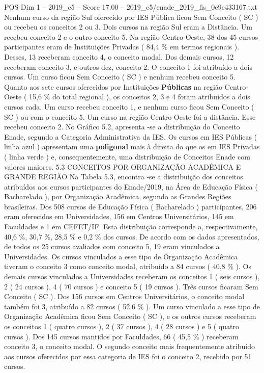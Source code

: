 \begin{textsample}{POS Dim 1 – 2019\_c5 – Score 17.00 – 2019\_c5/enade\_2019\_fis\_0e9c433167.txt}
Nenhum curso da região Sul oferecido por IES Pública ficou Sem Conceito ( SC ) ou recebeu os conceitos 2 ou 3.
Dois cursos na região Sul eram a Distância.
Um recebeu conceito 2 e o outro conceito 5.
Na região Centro-Oeste, 38 dos 45 cursos participantes eram de Instituições Privadas ( 84,4 \% em termos regionais ).
Desses, 13 receberam conceito 4, o conceito modal.
Dos demais cursos, 12 receberam conceito 3, e outros dez, conceito 2.
O conceito 1 foi atribuído a dois cursos.
Um curso ficou Sem Conceito ( SC ) e nenhum recebeu conceito 5.
Quanto aos sete cursos oferecidos por Instituições \textbf{Públicas} na região Centro-Oeste ( 15,6 \% do total regional ), os conceitos 2, 3 e 4 foram atribuídos a dois cursos cada.
Um curso recebeu conceito 1, e nenhum curso ficou Sem Conceito ( SC ) ou com o conceito 5.
Um curso na região Centro-Oeste foi a distância.
Esse recebeu conceito 2.
No Gráfico 5.2, apresenta -se a distribuição do Conceito Enade, segundo a Categoria Administrativa da IES.
Os cursos em IES Públicas ( linha azul ) apresentam uma \textbf{poligonal} mais à direita do que os em IES Privadas ( linha verde ) e, consequentemente, uma distribuição de Conceitos Enade com valores maiores. 5.3 CONCEITOS POR ORGANIZAÇÃO ACADÊMICA E GRANDE REGIÃO Na Tabela 5.3, encontra -se a distribuição dos conceitos atribuídos aos cursos participantes do Enade/2019, na Área de Educação Física ( Bacharelado ), por Organização Acadêmica, segundo as Grandes Regiões brasileiras.
Dos 508 cursos de Educação Física ( Bacharelado ) participantes, 206 eram oferecidos em Universidades, 156 em Centros Universitários, 145 em Faculdades e 1 em CEFET/IF.
Esta distribuição corresponde a, respectivamente, 40,6 \%, 30,7 \%, 28,5 \% e 0,2 \% dos cursos.
De acordo com os dados apresentados, de todos os 25 cursos avaliados com conceito 5, 19 eram vinculados a Universidades.
Os cursos vinculados a esse tipo de Organização Acadêmica tiveram o conceito 3 como conceito modal, atribuído a 84 cursos ( 40,8 \% ).
Os demais cursos vinculados a Universidades receberam os conceitos 1 ( seis cursos ), 2 ( 24 cursos ), 4 ( 70 cursos ) e conceito 5 ( 19 cursos ).
Três cursos ficaram Sem Conceito ( SC ).
Dos 156 cursos em Centros Universitários, o conceito modal também foi 3, atribuído a 82 cursos ( 52,6 \% ).
Um curso vinculado a esse tipo de Organização Acadêmica ficou Sem Conceito ( SC ), e os outros cursos receberam os conceitos 1 ( quatro cursos ), 2 ( 37 cursos ), 4 ( 28 cursos ) e 5 ( quatro cursos ).
Dos 145 cursos mantidos por Faculdades, 66 ( 45,5 \% ) receberam conceito 3, o conceito modal.
O segundo conceito mais frequentemente atribuído aos cursos oferecidos por essa categoria de IES foi o conceito 2, recebido por 51 cursos.

\end{textsample}
